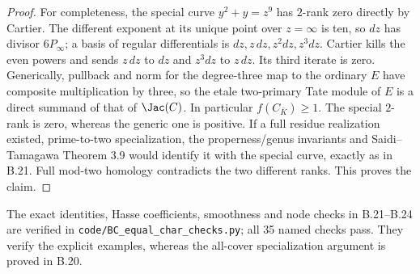 \begin{proof}
For completeness, the special curve $y^2+y=z^9$ has $2$-rank zero
directly by Cartier. The different exponent at its unique point over
$z=\infty$ is ten, so $dz$ has divisor $6P_\infty$; a basis of
regular differentials is $dz,z\,dz,z^2dz,z^3dz$. Cartier kills the
even powers and sends $z\,dz$ to $dz$ and $z^3dz$ to $z\,dz$.
Its third iterate is zero. Generically, pullback and norm for the
degree-three map to the ordinary $E$ have composite multiplication by
three, so the etale two-primary Tate module of $E$ is a direct summand
of that of $\Jac(C)$. In particular $f(C_{\bar K})\ge1$.
The special $2$-rank is zero, whereas the generic one is positive.
If a full residue realization existed, prime-to-two specialization,
the properness/genus invariants and Saidi--Tamagawa Theorem 3.9 would
identify it with the special curve, exactly as in B.21. Full mod-two
homology contradicts the two different ranks. This proves the claim.
\end{proof}

The exact identities, Hasse coefficients, smoothness and node checks in
B.21--B.24 are verified in \texttt{code/BC\_equal\_char\_checks.py};
all 35 named checks pass. They verify the explicit examples, whereas
the all-cover specialization argument is proved in B.20.
